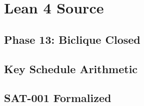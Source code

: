 \documentclass[10pt,conference,compsoc]{IEEEtran}
\begin{document}



\appendix
\section{Lean 4 Source}
\label{app:lean}
\subsection{Phase 13: Biclique Closed}

\subsection{Key Schedule Arithmetic}

\subsection{SAT-001 Formalized}

\end{document}
